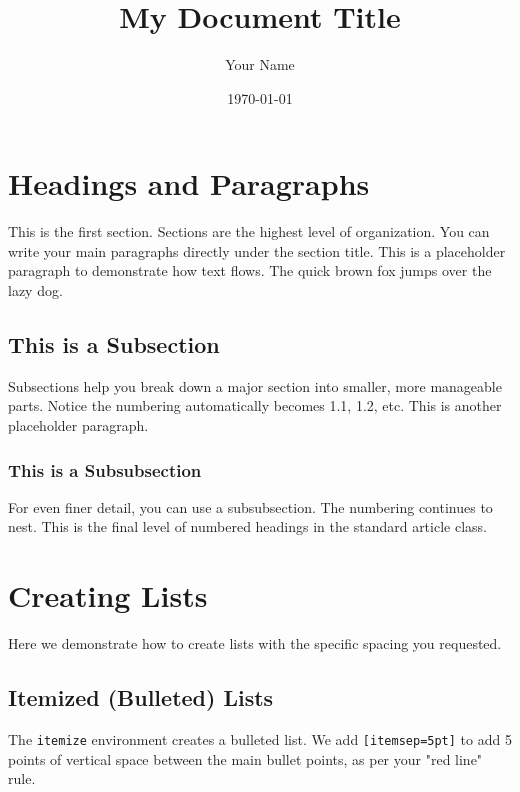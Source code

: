 \documentclass{article}
\title{My Document Title}
\author{Your Name}
\date{\today} %
\begin{document}
\maketitle


\section{Headings and Paragraphs}
This is the first section. Sections are the highest level of organization. You can write your main paragraphs directly under the section title. This is a placeholder paragraph to demonstrate how text flows. The quick brown fox jumps over the lazy dog.

\subsection{This is a Subsection}
Subsections help you break down a major section into smaller, more manageable parts. Notice the numbering automatically becomes 1.1, 1.2, etc. This is another placeholder paragraph.

\subsubsection{This is a Subsubsection}
For even finer detail, you can use a subsubsection. The numbering continues to nest. This is the final level of numbered headings in the standard article class.

\bigskip %


\section{Creating Lists}
Here we demonstrate how to create lists with the specific spacing you requested.

\subsection{Itemized (Bulleted) Lists}
The \texttt{itemize} environment creates a bulleted list. We add \texttt{[itemsep=5pt]} to add 5 points of vertical space between the main bullet points, as per your "red line" rule.
\end{document}
